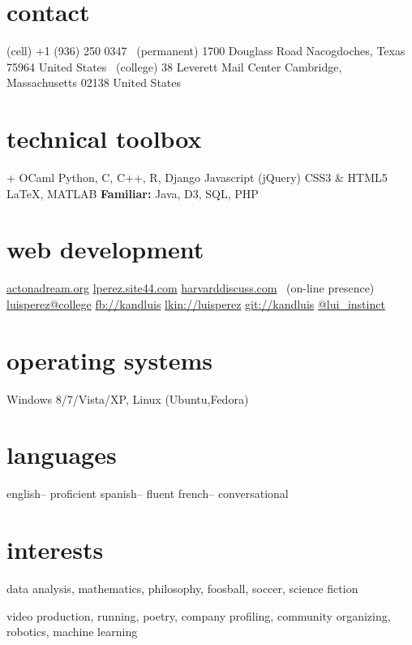 \documentclass[]{friggeri-cv} %
\begin{document}


\begin{aside} %
\section{contact}
(cell)
+1 (936) 250 0347
~(permanent)
1700 Douglass Road
Nacogdoches, Texas 75964
United States
~(college)
38 Leverett Mail Center
Cambridge, Massachusetts 02138
United States
\section{technical toolbox}
+ OCaml
Python, C, C++,
R, Django
Javascript (jQuery)
CSS3 \& HTML5
\LaTeX, MATLAB
\textbf{Familiar:} Java, D3, SQL, PHP
\section{web development}
\href{http://www.actonadream.org/}{actonadream.org}
\href{http://lperez.site44.com}{lperez.site44.com}
\href{https://www.hcs.harvard.edu/~harvarddiscuss/index.php/en/}{harvarddiscuss.com}
~(on-line presence)
\href{mailto:luisperez@college.harvard.edu}{luisperez@college}
\href{http://facebook.com/kandluis}{fb://kandluis}
\href{http://www.linkedin.com/pub/luis-perez/73/793/770}{lkin://luisperez}
\href{http://www.github.com/kandluis}{git://kandluis}
\href{http://www.twitter.com/lui\_instinct}{@lui\_instinct}
\section{operating systems}
Windows 8/7/Vista/XP, Linux (Ubuntu,Fedora)
\section{languages}
english-- proficient
spanish-- fluent
french-- conversational
\section{interests}
data analysis, mathematics, philosophy, foosball, soccer, science fiction
\begin{detailed}
video production, running, poetry, company profiling,  community organizing, robotics, machine learning
\end{detailed}
\end{aside}
\end{document}
